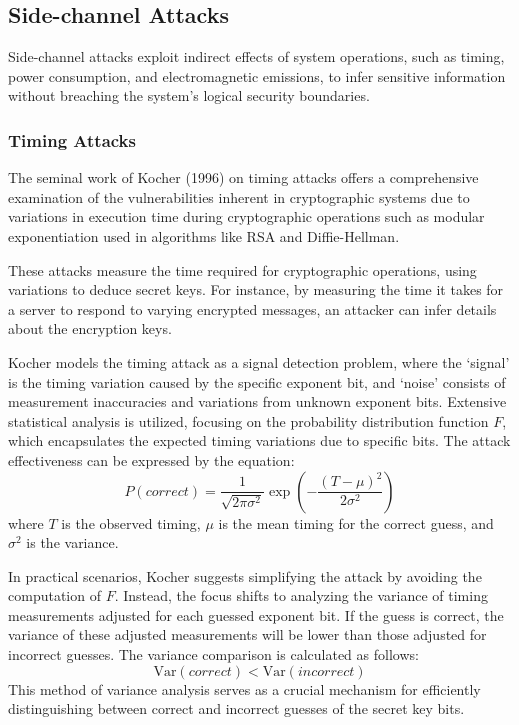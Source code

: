 \hypertarget{side-channel-attacks}{%
\subsection{Side-channel Attacks}\label{side-channel-attacks}}

Side-channel attacks exploit indirect effects of system operations, such
as timing, power consumption, and electromagnetic emissions, to infer
sensitive information without breaching the system's logical security
boundaries.

\subsubsection{Timing Attacks}

The seminal work of Kocher (1996)\cite{kocherTimingAttacksImplementations1996} on timing attacks offers a comprehensive examination of the vulnerabilities 
inherent in cryptographic systems due to variations in execution time during cryptographic operations such as modular exponentiation used in algorithms 
like RSA and Diffie-Hellman.

These attacks measure the time required for cryptographic operations,
using variations to deduce secret keys. For instance, by measuring the
time it takes for a server to respond to varying encrypted messages, an
attacker can infer details about the encryption keys.

Kocher models the timing attack as a signal detection problem, where the `signal' is the timing variation caused by the specific exponent bit, and `noise' consists of measurement inaccuracies and variations from unknown exponent bits. Extensive statistical analysis is utilized, focusing on the probability distribution function \( F \), which encapsulates the expected timing variations due to specific bits. The attack effectiveness can be expressed by the equation:
\[
P(correct) = \frac{1}{\sqrt{2\pi \sigma^2}} \exp\left(-\frac{(T - \mu)^2}{2\sigma^2}\right)
\]
where \( T \) is the observed timing, \( \mu \) is the mean timing for the correct guess, and \( \sigma^2 \) is the variance.

In practical scenarios, Kocher suggests simplifying the attack by avoiding the computation of \( F \). Instead, the focus shifts to analyzing the variance of timing measurements adjusted for each guessed exponent bit. If the guess is correct, the variance of these adjusted measurements will be lower than those adjusted for incorrect guesses. The variance comparison is calculated as follows:
\[
\text{Var}(correct) < \text{Var}(incorrect)
\]
This method of variance analysis serves as a crucial mechanism for efficiently distinguishing between correct and incorrect guesses of the secret key bits.

